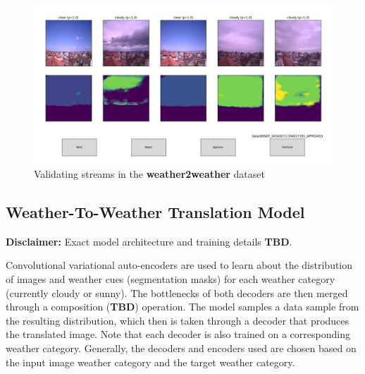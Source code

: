 \documentclass[11pt]{article}
\begin{document}
    \begin{figure}[!htb]
        \includegraphics[width=\linewidth]{images/dataset_tool.png}
        \caption{Validating streams in the \textbf{weather2weather} dataset}
        \label{fig:dataset_tool}
    \end{figure}

    \subsection{Weather-To-Weather Translation Model}

    \textbf{Disclaimer:} Exact model architecture and training details \textbf{TBD}.
    
    Convolutional variational auto-encoders are used to learn about the distribution
    of images and weather cues (segmentation masks) for each weather category (currently
    cloudy or sunny). The bottlenecks of both decoders are then merged through a composition
    (\textbf{TBD}) operation. The model samples a data sample from the resulting distribution,
    which then is taken through a decoder that produces the translated image. Note that
    each decoder is also trained on a corresponding weather category. Generally, the 
    decoders and encoders used are chosen based on the input image weather category and
    the target weather category.
\end{document}
